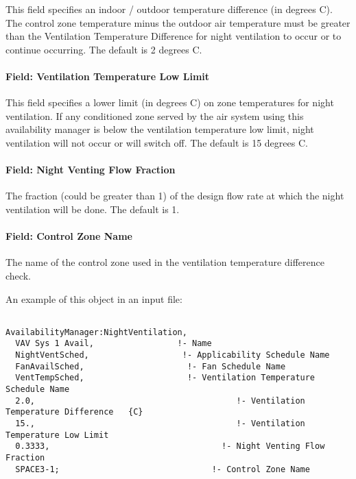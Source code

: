 This field specifies an indoor / outdoor temperature difference (in degrees C). The control zone temperature minus the outdoor air temperature must be greater than the Ventilation Temperature Difference for night ventilation to occur or to continue occurring. The default is 2 degrees C.

\paragraph{Field: Ventilation Temperature Low Limit}\label{field-ventilation-temperature-low-limit}

This field specifies a lower limit (in degrees C) on zone temperatures for night ventilation. If any conditioned zone served by the air system using this availability manager is below the ventilation temperature low limit, night ventilation will not occur or will switch off. The default is 15 degrees C.

\paragraph{Field: Night Venting Flow Fraction}\label{field-night-venting-flow-fraction}

The fraction (could be greater than 1) of the design flow rate at which the night ventilation will be done. The default is 1.

\paragraph{Field: Control Zone Name}\label{field-control-zone-name-000}

The name of the control zone used in the ventilation temperature difference check.

An example of this object in an input file:

\begin{lstlisting}

AvailabilityManager:NightVentilation,
  VAV Sys 1 Avail,                 !- Name
  NightVentSched,                   !- Applicability Schedule Name
  FanAvailSched,                     !- Fan Schedule Name
  VentTempSched,                     !- Ventilation Temperature Schedule Name
  2.0,                                         !- Ventilation Temperature Difference   {C}
  15.,                                         !- Ventilation Temperature Low Limit
  0.3333,                                   !- Night Venting Flow Fraction
  SPACE3-1;                               !- Control Zone Name
\end{lstlisting}

